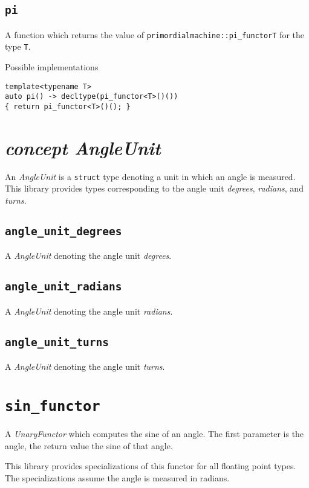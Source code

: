 \documentclass[oneside]{book}
\begin{document}
\subsection{\texttt{pi}}
A function which returns the value of \texttt{primordialmachine::pi\_functor\textlangle T\textrangle}
for the type \texttt{T}.

\noindent{}Possible implementations
\begin{verbatim}
template<typename T>
auto pi() -> decltype(pi_functor<T>()())
{ return pi_functor<T>()(); }
\end{verbatim}

\section{\textit{concept AngleUnit}}
An \textit{AngleUnit} is a \texttt{struct} type denoting a unit in which an angle is measured.
This library provides types corresponding to the angle unit \textit{degrees}, \textit{radians},
and \textit{turns}.

\subsection{\texttt{angle\_unit\_degrees}}
A \textit{AngleUnit} denoting the angle unit \textit{degrees}.
\subsection{\texttt{angle\_unit\_radians}}
A \textit{AngleUnit} denoting the angle unit \textit{radians}.
\subsection{\texttt{angle\_unit\_turns}}
A \textit{AngleUnit} denoting the angle unit \textit{turns}.

\section{\texttt{sin\_functor}}
A \textit{UnaryFunctor} which computes the
sine
of an angle.
The first parameter is the angle, the return value the sine of that angle.

\noindent{}This library provides specializations of this functor for all floating point types.
The specializations assume the angle is measured in radians.\\
\end{document}
